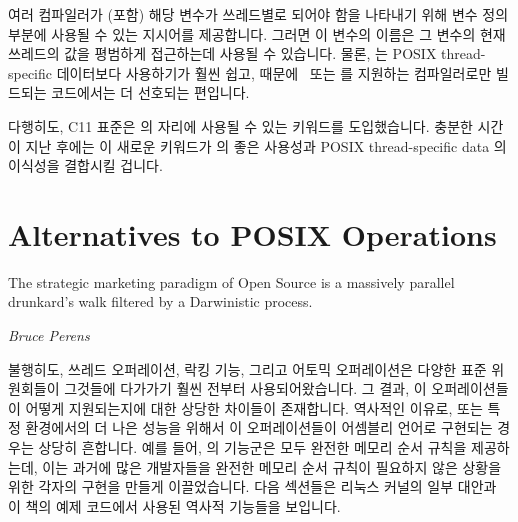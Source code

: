 \fi

여러 컴파일러가 (\GCC 포함) 해당 변수가 쓰레드별로 되어야 함을 나타내기 위해
변수 정의 부분에 사용될 수 있는  지시어를 제공합니다.
그러면 이 변수의 이름은 그 변수의 현재 쓰레드의 값을 평범하게 접근하는데 사용될
수 있습니다.
물론,  는 POSIX thread-specific 데이터보다 사용하기가 훨씬 쉽고,
때문에 \GCC\ 또는  를 지원하는 컴파일러로만 빌드되는 코드에서는 더
선호되는 편입니다.

다행히도, C11 표준은  의 자리에 사용될 수 있는
 키워드를 도입했습니다.
충분한 시간이 지난 후에는 이 새로운 키워드가  의 좋은 사용성과
POSIX thread-specific data 의 이식성을 결합시킬 겁니다.

\section{Alternatives to POSIX Operations}
\label{sec:toolsoftrade:Alternatives to POSIX Operations}
%
\epigraph{The strategic marketing paradigm of Open Source is a massively
	  parallel drunkard's walk filtered by a Darwinistic process.}
	 {\emph{Bruce Perens}}

불행히도, 쓰레드 오퍼레이션, 락킹 기능, 그리고 어토믹 오퍼레이션은 다양한 표준
위원회들이 그것들에 다가가기 훨씬 전부터 사용되어왔습니다.
그 결과, 이 오퍼레이션들이 어떻게 지원되는지에 대한 상당한 차이들이 존재합니다.
역사적인 이유로, 또는 특정 환경에서의 더 나은 성능을 위해서 이 오퍼레이션들이
어셈블리 언어로 구현되는 경우는 상당히 흔합니다.
예를 들어, \GCC 의  기능군은 모두 완전한 메모리 순서 규칙을
제공하는데, 이는 과거에 많은 개발자들을 완전한 메모리 순서 규칙이 필요하지 않은
상황을 위한 각자의 구현을 만들게 이끌었습니다.
다음 섹션들은 리눅스 커널의 일부 대안과 이 책의 예제 코드에서 사용된 역사적
기능들을 보입니다.


